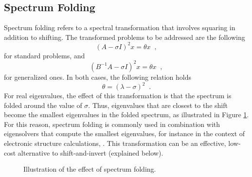 \subsection{Spectrum Folding}

Spectrum folding refers to a spectral transformation that involves squaring in addition to shifting. The transformed problems to be addressed are the following
\begin{equation}(A-\sigma I)^2x=\theta x\;\;,\end{equation}
for standard problems, and 
\begin{equation}(B^{-1}A-\sigma I)^2 x=\theta x\;\;,\end{equation}
for generalized ones. In both cases, the following relation holds 
\begin{equation}\theta=(\lambda-\sigma)^2\;\;.\end{equation}
For real eigenvalues, the effect of this transformation is that the spectrum is folded around the value of $\sigma$. Thus, eigenvalues that are closest to the shift become the smallest eigenvalues in the folded spectrum, as illustrated in Figure \ref{fig:fold}. For this reason, spectrum folding is commonly used in combination with eigensolvers that compute the smallest eigenvalues, for instance in the context of electronic structure calculations, \citep{Canning:2000:PEP}. This transformation can be an effective, low-cost alternative to shift-and-invert (explained below).

  \begin{figure}
    \centering
    \caption{\label{fig:fold}Illustration of the effect of spectrum folding.}
  \end{figure}

